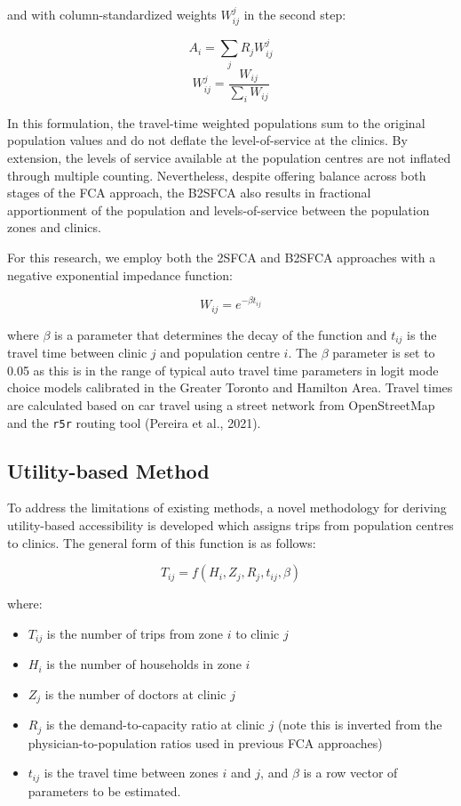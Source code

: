 \documentclass[]{elsarticle} %
\providecommand{\tightlist}{%
  \setlength{\itemsep}{0pt}\setlength{\parskip}{0pt}}
\begin{document}
and with column-standardized weights \(W_{ij}^{j}\) in the second step:

\[
A_i = \sum_j{R_jW_{ij}^{j}}
\] \[
W_{ij}^{j} = \frac{W_{ij}}{\sum_i W_{ij}}
\]

In this formulation, the travel-time weighted populations sum to the
original population values and do not deflate the level-of-service at
the clinics. By extension, the levels of service available at the
population centres are not inflated through multiple counting.
Nevertheless, despite offering balance across both stages of the FCA
approach, the B2SFCA also results in fractional apportionment of the
population and levels-of-service between the population zones and
clinics.

For this research, we employ both the 2SFCA and B2SFCA approaches with a
negative exponential impedance function:

\[
W_{ij} = e^{-\beta t_{ij}}
\]

where \(\beta\) is a parameter that determines the decay of the function
and \(t_{ij}\) is the travel time between clinic \(j\) and population
centre \(i\). The \(\beta\) parameter is set to 0.05 as this is in the
range of typical auto travel time parameters in logit mode choice models
calibrated in the Greater Toronto and Hamilton Area. Travel times are
calculated based on car travel using a street network from OpenStreetMap
and the \texttt{r5r} routing tool (Pereira et al., 2021).

\hypertarget{utility-based-method}{%
\subsection{Utility-based Method}\label{utility-based-method}}

To address the limitations of existing methods, a novel methodology for
deriving utility-based accessibility is developed which assigns trips
from population centres to clinics. The general form of this function is
as follows:

\[
T_{ij} = f(H_i, Z_j, R_j, t_{ij}, \beta)
\]

where:

\begin{itemize}
\tightlist
\item
  \(T_{ij}\) is the number of trips from zone \(i\) to clinic \(j\)
\item
  \(H_i\) is the number of households in zone \(i\)
\item
  \(Z_j\) is the number of doctors at clinic \(j\)
\item
  \(R_j\) is the demand-to-capacity ratio at clinic \(j\) (note this is
  inverted from the physician-to-population ratios used in previous FCA
  approaches)
\item
  \(t_{ij}\) is the travel time between zones \(i\) and \(j\), and
  \(\beta\) is a row vector of parameters to be estimated.
\end{itemize}
\end{document}
